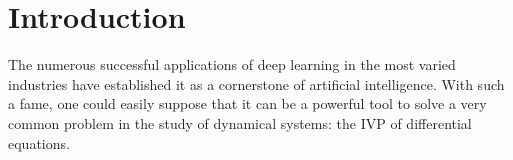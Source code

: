 \chapter{Introduction}\label{ch:intro}







The numerous successful applications of deep learning in the most varied industries \cite{ciregan_multi-column_2012,krizhevsky_imagenet_2012,silver_mastering_2016} have established it as a cornerstone of artificial intelligence.
With such a fame, one could easily suppose that it can be a powerful tool to solve a very common problem in the study of dynamical systems: the \gls{IVP} of differential equations.

